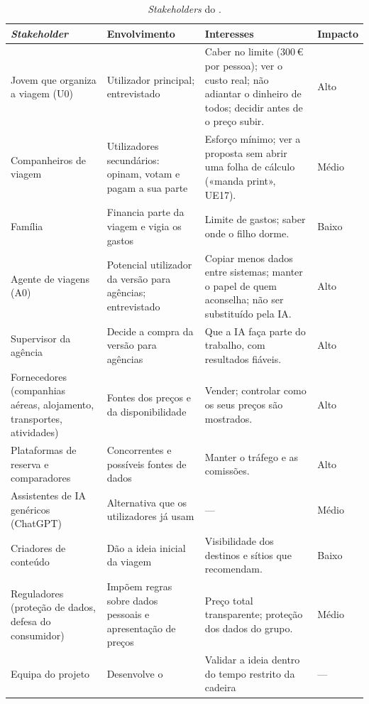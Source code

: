 \begin{table}[!htbp]
\centering\small
\begin{tabularx}{\textwidth}{@{}p{2.9cm}p{3.3cm}Lp{1.2cm}@{}}
\toprule
\textbf{\textit{Stakeholder}} & \textbf{Envolvimento} & \textbf{Interesses} & \textbf{Impacto} \\
\midrule
Jovem que organiza a viagem (U0) & Utilizador principal; entrevistado & Caber no limite (300\,€ por pessoa); ver o custo real; não adiantar o dinheiro de todos; decidir antes de o preço subir. & Alto \\
Companheiros de viagem & Utilizadores secundários: opinam, votam e pagam a sua parte & Esforço mínimo; ver a proposta sem abrir uma folha de cálculo («manda print», UE17). & Médio \\
Família & Financia parte da viagem e vigia os gastos & Limite de gastos; saber onde o filho dorme. & Baixo \\
Agente de viagens (A0) & Potencial utilizador da versão para agências; entrevistado & Copiar menos dados entre sistemas; manter o papel de quem aconselha; não ser substituído pela IA. & Alto \\
Supervisor da agência & Decide a compra da versão para agências & Que a IA faça parte do trabalho, com resultados fiáveis. & Alto \\
Fornecedores (companhias aéreas, alojamento, transportes, atividades) & Fontes dos preços e da disponibilidade & Vender; controlar como os seus preços são mostrados. & Alto \\
Plataformas de reserva e comparadores & Concorrentes e possíveis fontes de dados & Manter o tráfego e as comissões. & Alto \\
Assistentes de IA genéricos (ChatGPT) & Alternativa que os utilizadores já usam & --- & Médio \\
Criadores de conteúdo & Dão a ideia inicial da viagem  & Visibilidade dos destinos e sítios que recomendam. & Baixo \\
Reguladores (proteção de dados, defesa do consumidor) & Impõem regras sobre dados pessoais e apresentação de preços & Preço total transparente; proteção dos dados do grupo. & Médio \\
Equipa do projeto & Desenvolve o \projeto{} & Validar a ideia dentro do tempo restrito da cadeira & --- \\
\bottomrule
\end{tabularx}
\caption{\textit{Stakeholders} do \projeto.}
\label{tab:stakeholders}
\end{table}

